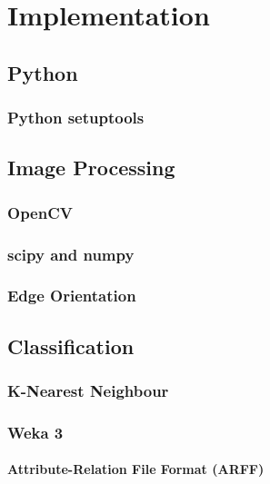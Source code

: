 \chapter{Implementation}



\section{Python}

\subsection{Python setuptools}


\section{Image Processing}

\subsection{OpenCV}

\subsection{scipy and numpy}

\subsection{Edge Orientation}


\section{Classification}

\subsection{K-Nearest Neighbour}

\subsection{Weka 3}

\subsubsection{Attribute-Relation File Format (ARFF)}

